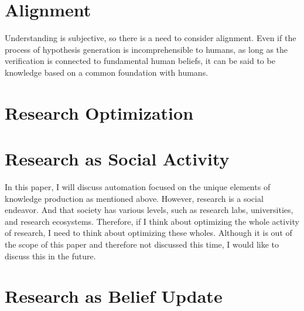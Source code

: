 \documentclass{book}
\begin{document}
\chapter{Alignment}
Understanding is subjective, so there is a need to consider alignment. Even if the process of hypothesis generation is incomprehensible to humans, as long as the verification is connected to fundamental human beliefs, it can be said to be knowledge based on a common foundation with humans.

\chapter{Research Optimization}

\chapter{Research as Social Activity}
In this paper, I will discuss automation focused on the unique elements of knowledge production as mentioned above. However, research is a social endeavor. And that society has various levels, such as research labs, universities, and research ecosystems. Therefore, if I think about optimizing the whole activity of research, I need to think about optimizing these wholes. Although it is out of the scope of this paper and therefore not discussed this time, I would like to discuss this in the future.

\chapter{Research as Belief Update}
\end{document}
